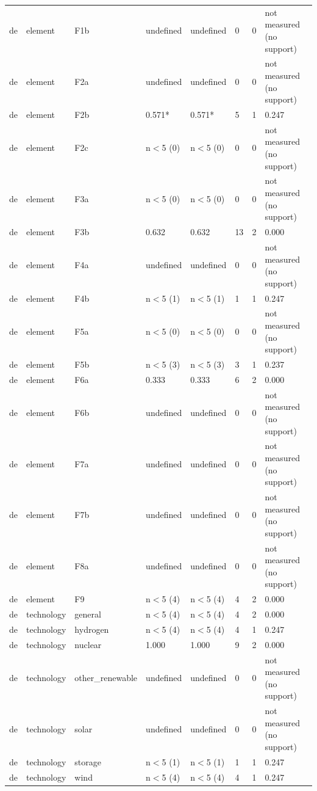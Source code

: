 \begin{table}[htbp]
\begin{tabular}{llllllll}
de & element & F1b & undefined & undefined & 0 & 0 & not measured (no support) \\
de & element & F2a & undefined & undefined & 0 & 0 & not measured (no support) \\
de & element & F2b & 0.571* & 0.571* & 5 & 1 & 0.247 \\
de & element & F2c & n$<$5 (0) & n$<$5 (0) & 0 & 0 & not measured (no support) \\
de & element & F3a & n$<$5 (0) & n$<$5 (0) & 0 & 0 & not measured (no support) \\
de & element & F3b & 0.632 & 0.632 & 13 & 2 & 0.000 \\
de & element & F4a & undefined & undefined & 0 & 0 & not measured (no support) \\
de & element & F4b & n$<$5 (1) & n$<$5 (1) & 1 & 1 & 0.247 \\
de & element & F5a & n$<$5 (0) & n$<$5 (0) & 0 & 0 & not measured (no support) \\
de & element & F5b & n$<$5 (3) & n$<$5 (3) & 3 & 1 & 0.237 \\
de & element & F6a & 0.333 & 0.333 & 6 & 2 & 0.000 \\
de & element & F6b & undefined & undefined & 0 & 0 & not measured (no support) \\
de & element & F7a & undefined & undefined & 0 & 0 & not measured (no support) \\
de & element & F7b & undefined & undefined & 0 & 0 & not measured (no support) \\
de & element & F8a & undefined & undefined & 0 & 0 & not measured (no support) \\
de & element & F9 & n$<$5 (4) & n$<$5 (4) & 4 & 2 & 0.000 \\
de & technology & general & n$<$5 (4) & n$<$5 (4) & 4 & 2 & 0.000 \\
de & technology & hydrogen & n$<$5 (4) & n$<$5 (4) & 4 & 1 & 0.247 \\
de & technology & nuclear & 1.000 & 1.000 & 9 & 2 & 0.000 \\
de & technology & other\_renewable & undefined & undefined & 0 & 0 & not measured (no support) \\
de & technology & solar & undefined & undefined & 0 & 0 & not measured (no support) \\
de & technology & storage & n$<$5 (1) & n$<$5 (1) & 1 & 1 & 0.247 \\
de & technology & wind & n$<$5 (4) & n$<$5 (4) & 4 & 1 & 0.247 \\

\end{tabular}
\end{table}
